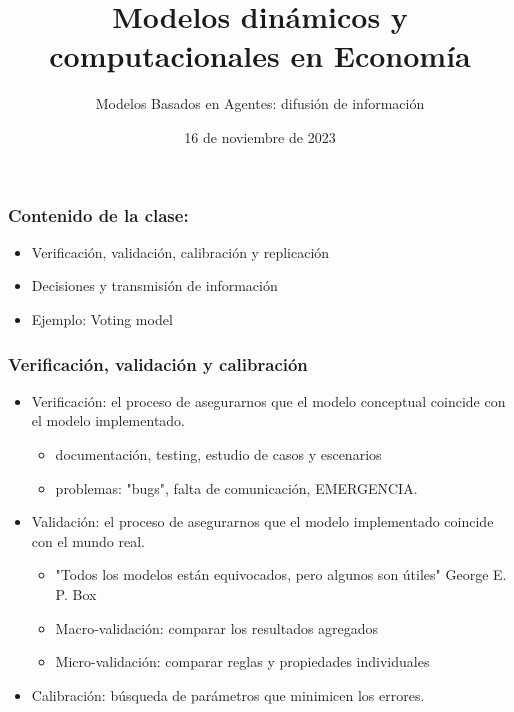 \documentclass[11pt]{beamer}
\begin{document}
	\title{Modelos dinámicos y computacionales en Economía}
	\subtitle{Modelos Basados en Agentes: difusión de información}
	\date{16 de noviembre de 2023}


\begin{frame}
\frametitle{Contenido de la clase:}
\begin{itemize}
	\item Verificación, validación, calibración y replicación
	\item Decisiones y transmisión de información
	\item Ejemplo: Voting model
\end{itemize}
\end{frame}

\begin{frame}
	\frametitle{Verificación, validación y calibración} 
	\begin{itemize}
		\item Verificación: el proceso de asegurarnos que el modelo conceptual coincide con el modelo implementado.
		\begin{itemize}
			\item documentación, testing, estudio de casos y escenarios
			\item problemas: "bugs", falta de comunicación, EMERGENCIA.
		\end{itemize}
		\item Validación: el proceso de asegurarnos que el modelo implementado coincide con el mundo real.
		\begin{itemize}
			\item "Todos los modelos están equivocados, pero algunos son útiles" George E. P. Box
			\item Macro-validación: comparar los resultados agregados
			\item Micro-validación: comparar reglas y propiedades individuales
		\end{itemize}
		\item Calibración: búsqueda de parámetros que minimicen los errores.
	\end{itemize}
\end{frame}
\end{document}
